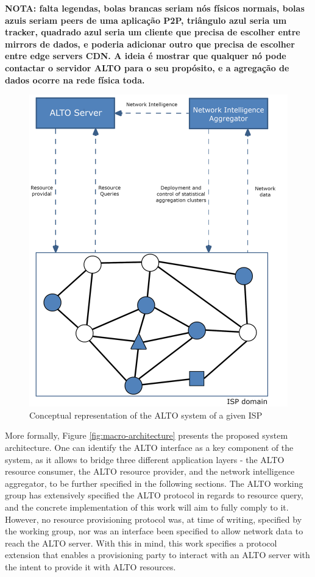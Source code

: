 \textbf{NOTA: falta legendas, bolas brancas seriam nós físicos normais, bolas azuis seriam peers de uma aplicação P2P, triângulo azul seria um tracker, quadrado azul seria um cliente que precisa de escolher entre mirrors de dados, e poderia adicionar outro que precisa de escolher entre edge servers CDN. A ideia é mostrar que qualquer nó pode contactar o servidor ALTO para o seu propósito, e a agregação de dados ocorre na rede física toda.}

\begin{figure}[!h]
        \centering
        \includegraphics[scale=0.75]{img/architecture-network.png}
        \caption{Conceptual representation of the ALTO system of a given ISP}
        \label{fig:architecture-network}
\end{figure}

More formally, Figure \ref{fig:macro-architecture} presents the proposed system architecture. One can identify the ALTO interface as a key component of the system, as it allows to bridge three different application layers - the ALTO resource consumer, the ALTO resource provider, and the network intelligence aggregator, to be further specified in the following sections. The ALTO working group has extensively specified the ALTO protocol in regards to resource query, and the concrete implementation of this work will aim to fully comply to it. However, no resource provisioning protocol was, at time of writing, specified by the working group, nor was an interface been specified to allow network data to reach the ALTO server. With this in mind, this work specifies a protocol extension that enables a provisioning party to interact with an ALTO server with the intent to provide it with ALTO resources.

